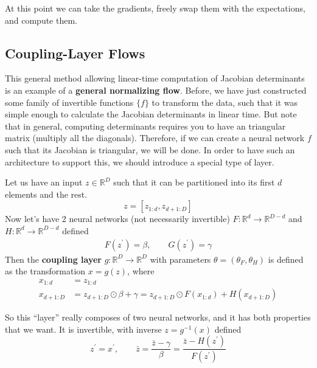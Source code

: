 \documentclass{article}
\begin{document}
  At this point we can take the gradients, freely swap them with the expectations, and compute them. 

\subsection{Coupling-Layer Flows} 

    This general method allowing linear-time computation of Jacobian determinants is an example of a \textbf{general normalizing flow}. Before, we have just constructed some family of invertible functions $\{f\}$ to transform the data, such that it was simple enough to calculate the Jacobian determinants in linear time. But note that in general, computing determinants requires you to have an triangular matrix (multiply all the diagonals). Therefore, if we can create a neural network $f$ such that its Jacobian is triangular, we will be done. In order to have such an architecture to support this, we should introduce a special type of layer.  

    \begin{definition}
      Let us have an input $z \in \mathbb{R}^D$ such that it can be partitioned into its first $d$ elements and the rest. 
      \begin{equation}
        z = [z_{1:d}, z_{d+1:D}]
      \end{equation}
      Now let's have 2 neural networks (not necessarily invertible) $F: \mathbb{R}^d \rightarrow \mathbb{R}^{D-d}$ and $H: \mathbb{R}^d \rightarrow \mathbb{R}^{D-d}$ defined 
      \begin{align}
        F(z^\prime) = \beta, \qquad G(z^\prime) = \gamma
      \end{align}
      Then the \textbf{coupling layer} $g: \mathbb{R}^D \rightarrow \mathbb{R}^D$ with parameters $\theta = (\theta_F, \theta_H)$ is defined as the transformation $x = g(z)$, where
      \begin{align}
        x_{1:d} & = z_{1:d} \\ 
        x_{d+1:D} & = z_{d+1:D} \odot \beta + \gamma = z_{d+1:D} \odot F(x_{1:d}) + H(x_{d+1:D})
      \end{align}
    \end{definition}

    So this ``layer'' really composes of two neural networks, and it has both properties that we want. It is invertible, with inverse $z = g^{-1} (x)$ defined 
    \begin{equation}
      z^\prime = x^\prime, \qquad \bar{z} = \frac{\bar{z} - \gamma}{\beta} = \frac{\bar{z} - H(z^\prime)}{F(z^\prime)} 
    \end{equation} 
\end{document}
